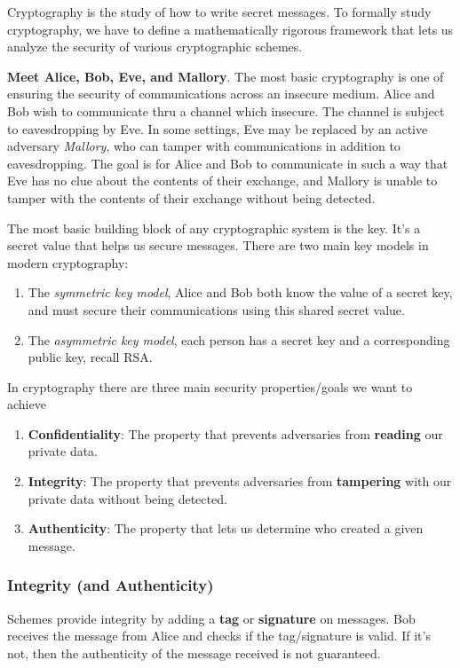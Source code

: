 \documentclass{article}
\begin{document}
Cryptography is the study of how to write secret messages. To formally study cryptography, we have to define a mathematically rigorous framework that lets us analyze the security of various cryptographic schemes.

\textbf{Meet Alice, Bob, Eve, and Mallory}. The most basic cryptography is one of ensuring the security of communications across an insecure medium. Alice and Bob wish to communicate thru a channel which insecure. The channel is subject to eavesdropping by Eve. In some settings, Eve may be replaced by an active adversary \emph{Mallory}, who can tamper with communications in addition to eavesdropping. The goal is for Alice and Bob to communicate in such a way that Eve has no clue about the contents of their exchange, and Mallory is unable to tamper with the contents of their exchange without being detected.

\begin{definition}[Key]
    The most basic building block of any cryptographic system is the key. It's a secret value that helps us secure messages. There are two main key models in modern cryptography:
    \begin{enumerate}
        \item  The \emph{symmetric key model}, Alice and Bob both know the value of a secret key, and must secure their communications using this shared secret value.
        \item The \emph{asymmetric key model}, each person has a secret key and a corresponding public key, recall RSA.
    \end{enumerate}
\end{definition}

In cryptography there are three main security properties/goals we want to achieve
\begin{enumerate}
    \item \textbf{Confidentiality}: The property that prevents adversaries from \textbf{reading} our private data.
    \item \textbf{Integrity}: The property that prevents adversaries from \textbf{tampering} with our private data without being detected.
    \item \textbf{Authenticity}: The property that lets us determine who created a given message.
\end{enumerate}
\subsubsection{Integrity (and Authenticity)}
Schemes provide integrity by adding a \textbf{tag} or \textbf{signature} on messages. Bob receives the message from Alice and checks if the tag/signature is valid. If it's not, then the authenticity of the message received is not guaranteed.
\end{document}
